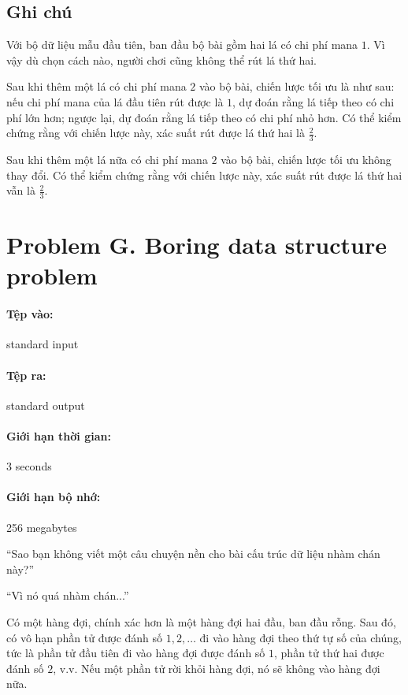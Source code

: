 \documentclass[11pt]{article}
\begin{document}
\subsection*{Ghi chú}

Với bộ dữ liệu mẫu đầu tiên, ban đầu bộ bài gồm hai lá có chi phí mana \(1\).
Vì vậy dù chọn cách nào, người chơi cũng không thể rút lá thứ hai.

Sau khi thêm một lá có chi phí mana \(2\) vào bộ bài, chiến lược tối ưu là như
sau: nếu chi phí mana của lá đầu tiên rút được là \(1\), dự đoán rằng lá tiếp
theo có chi phí lớn hơn; ngược lại, dự đoán rằng lá tiếp theo có chi phí nhỏ
hơn. Có thể kiểm chứng rằng với chiến lược này, xác suất rút được lá thứ hai
là \(\frac{2}{3}\).

Sau khi thêm một lá nữa có chi phí mana \(2\) vào bộ bài, chiến lược tối ưu
không thay đổi. Có thể kiểm chứng rằng với chiến lược này, xác suất rút được
lá thứ hai vẫn là \(\frac{2}{3}\).

\section{Problem G. Boring data structure problem}

\paragraph{Tệp vào:} standard input
\paragraph{Tệp ra:} standard output
\paragraph{Giới hạn thời gian:} 3 seconds
\paragraph{Giới hạn bộ nhớ:} 256 megabytes

``Sao bạn không viết một câu chuyện nền cho bài cấu trúc dữ liệu nhàm chán
này?''

``Vì nó quá nhàm chán...''

Có một hàng đợi, chính xác hơn là một hàng đợi hai đầu, ban đầu rỗng. Sau đó,
có vô hạn phần tử được đánh số \(1,2,\ldots\) đi vào hàng đợi theo thứ tự số
của chúng, tức là phần tử đầu tiên đi vào hàng đợi được đánh số \(1\), phần tử
thứ hai được đánh số \(2\), v.v. Nếu một phần tử rời khỏi hàng đợi, nó sẽ
không vào hàng đợi nữa.
\end{document}
